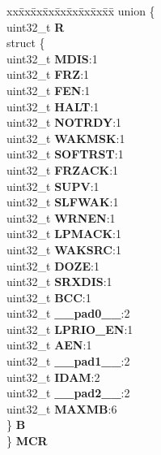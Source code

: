 \begin{DoxyCompactItemize}
\item 
\mbox{\label{structFLEXCAN__tag_ab7966ad49288e0b5f8506908ba16d4b4}} 
\begin{tabbing}
xx\=xx\=xx\=xx\=xx\=xx\=xx\=xx\=xx\=\kill
union \{\\
\>uint32\_t {\bfseries R}\\
\>struct \{\\
\>\>uint32\_t {\bfseries MDIS}:1\\
\>\>uint32\_t {\bfseries FRZ}:1\\
\>\>uint32\_t {\bfseries FEN}:1\\
\>\>uint32\_t {\bfseries HALT}:1\\
\>\>uint32\_t {\bfseries NOTRDY}:1\\
\>\>uint32\_t {\bfseries WAKMSK}:1\\
\>\>uint32\_t {\bfseries SOFTRST}:1\\
\>\>uint32\_t {\bfseries FRZACK}:1\\
\>\>uint32\_t {\bfseries SUPV}:1\\
\>\>uint32\_t {\bfseries SLFWAK}:1\\
\>\>uint32\_t {\bfseries WRNEN}:1\\
\>\>uint32\_t {\bfseries LPMACK}:1\\
\>\>uint32\_t {\bfseries WAKSRC}:1\\
\>\>uint32\_t {\bfseries DOZE}:1\\
\>\>uint32\_t {\bfseries SRXDIS}:1\\
\>\>uint32\_t {\bfseries BCC}:1\\
\>\>uint32\_t {\bfseries \_\_pad0\_\_}:2\\
\>\>uint32\_t {\bfseries LPRIO\_EN}:1\\
\>\>uint32\_t {\bfseries AEN}:1\\
\>\>uint32\_t {\bfseries \_\_pad1\_\_}:2\\
\>\>uint32\_t {\bfseries IDAM}:2\\
\>\>uint32\_t {\bfseries \_\_pad2\_\_}:2\\
\>\>uint32\_t {\bfseries MAXMB}:6\\
\>\} {\bfseries B}\\
\} {\bfseries MCR}\\


\end{tabbing}
\end{DoxyCompactItemize}
